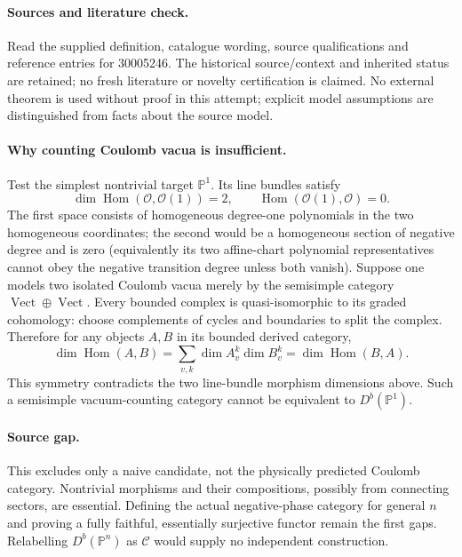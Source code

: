 \documentclass[11pt]{article}
\begin{document}
\paragraph{Sources and literature check.}
Read the supplied definition, catalogue wording, source qualifications and reference entries for 30005246. The historical source/context and inherited status are retained; no fresh literature or novelty certification is claimed. No external theorem is used without proof in this attempt; explicit model assumptions are distinguished from facts about the source model.

\paragraph{Why counting Coulomb vacua is insufficient.} Test the simplest nontrivial target \(\mathbb P^1\). Its line bundles satisfy
\[
 \dim\operatorname{Hom}(\mathcal O,\mathcal O(1))=2,
 \qquad \operatorname{Hom}(\mathcal O(1),\mathcal O)=0.
\]
The first space consists of homogeneous degree-one polynomials in the two homogeneous coordinates; the second would be a homogeneous section of negative degree and is zero (equivalently its two affine-chart polynomial representatives cannot obey the negative transition degree unless both vanish).
Suppose one models two isolated Coulomb vacua merely by the semisimple category \(\operatorname{Vect}\oplus\operatorname{Vect}\). Every bounded complex is quasi-isomorphic to its graded cohomology: choose complements of cycles and boundaries to split the complex. Therefore for any objects \(A,B\) in its bounded derived category,
\[
 \dim\operatorname{Hom}(A,B)=\sum_{v,k}\dim A_v^k\dim B_v^k
 =\dim\operatorname{Hom}(B,A).
\]
This symmetry contradicts the two line-bundle morphism dimensions above. Such a semisimple vacuum-counting category cannot be equivalent to \(D^b(\mathbb P^1)\).
\paragraph{Source gap.} This excludes only a naive candidate, not the physically predicted Coulomb category. Nontrivial morphisms and their compositions, possibly from connecting sectors, are essential. Defining the actual negative-phase category for general \(n\) and proving a fully faithful, essentially surjective functor remain the first gaps. Relabelling \(D^b(\mathbb P^n)\) as \(\mathcal C\) would supply no independent construction.
\end{document}
